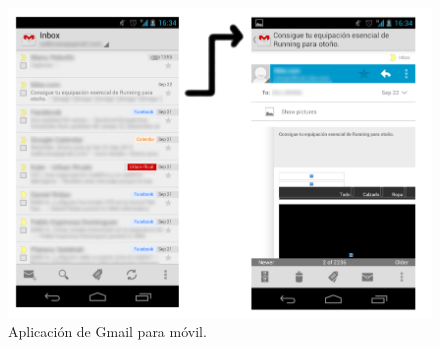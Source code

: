 \begin{figure}
  \centering
    \includegraphics[scale=0.4]{./Android/imagenes/gmailMovil.png}
  \caption{Aplicación de Gmail para móvil.}
  \label{fig:gmailMovil}
\end{figure}

